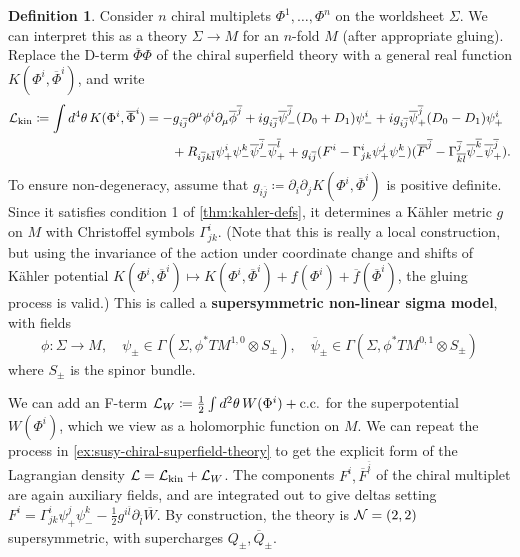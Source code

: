 \documentclass{report}
\theoremstyle{plain}
\theoremstyle{definition}
\newtheorem{definition}[theorem]{Definition}
\theoremstyle{remark}
\newcommand{\di}{\partial}
\newcommand{\cnj}{\overline}
\begin{document}
\begin{definition}
  Consider $n$ chiral multiplets $\Phi^1, \ldots, \Phi^n$ on the
  worldsheet $\Sigma$. We can interpret this as a theory $\Sigma \to
  M$ for an $n$-fold $M$ (after appropriate gluing). Replace the
  D-term $\cnj\Phi\Phi$ of the chiral superfield theory with a general
  real function $K(\Phi^i, \cnj\Phi^i)$, and write
  \begin{align} \label{eq:nlsm-lagrangian}
    \begin{split}
      {\cal L}_{\text{kin}} \coloneqq \int d^4\theta \, K(\Phi^i, \cnj\Phi^i)
      &= -g_{i\cnj j} \di^\mu \phi^i \di_\mu \cnj\phi^{\cnj j} + ig_{i\cnj j} \cnj \psi^{\cnj j}_-(D_0 + D_1)\psi_-^i + ig_{i\cnj j} \cnj \psi^{\cnj j}_+(D_0 - D_1)\psi_+^i \\
      &\qquad + R_{i\cnj j k \cnj l} \psi_+^i \psi_-^k \cnj\psi_-^{\cnj j} \cnj\psi_+^{\cnj l} + g_{i\cnj j}(F^i - \Gamma^i_{jk} \psi_+^j \psi_-^k)(\cnj F^{\cnj j} - \Gamma^{\cnj j}_{\cnj k \cnj l} \cnj\psi_-^{\cnj k} \cnj\psi_+^{\cnj j}).
    \end{split}
  \end{align}
  To ensure non-degeneracy, assume that $g_{i\cnj j} \coloneqq \di_i
  \di_j K(\Phi^i, \cnj\Phi^i)$ is positive definite. Since it
  satisfies condition 1 of \ref{thm:kahler-defs}, it determines a
  K\"ahler metric $g$ on $M$ with Christoffel symbols $\Gamma^i_{jk}$.
  (Note that this is really a local construction, but using the
  invariance of the action under coordinate change and shifts of
  K\"ahler potential $K(\Phi^i, \cnj\Phi^i) \mapsto K(\Phi^i,
  \cnj\Phi^i) + f(\Phi^i) + \cnj f(\cnj \Phi^i)$, the gluing process
  is valid.) This is called a {\bf supersymmetric non-linear sigma
    model}, with fields
  \[ \phi\colon \Sigma \to M, \quad \psi_\pm \in \Gamma(\Sigma, \phi^*TM^{1,0} \otimes S_\pm), \quad \cnj\psi_\pm \in \Gamma(\Sigma, \phi^*TM^{0,1} \otimes S_\pm) \]
  where $S_\pm$ is the spinor bundle.

  We can add an F-term ${\cal L}_W \coloneqq \frac{1}{2} \int
  d^2\theta \, W(\Phi^i) + \text{c.c.}$ for the superpotential
  $W(\Phi^i)$, which we view as a holomorphic function on $M$. We can
  repeat the process in \ref{ex:susy-chiral-superfield-theory} to get
  the explicit form of the Lagrangian density ${\cal L} = {\cal
    L}_{\text{kin}} + {\cal L}_W$. The components $F^i, \cnj F^{\cnj
    i}$ of the chiral multiplet are again auxiliary fields, and are
  integrated out to give deltas setting $F^i = \Gamma^i_{jk}\psi_+^j
  \psi_-^k - \frac{1}{2} g^{i\cnj l} \di_{\cnj l}\cnj W$. By
  construction, the theory is ${\cal N} = (2,2)$ supersymmetric, with
  supercharges $Q_\pm, \cnj Q_\pm$.
\end{definition}
\end{document}
